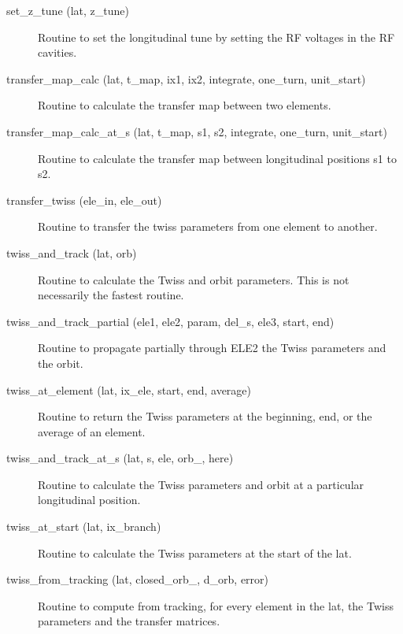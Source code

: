 \begin{description}
\label{r:set.z.tune}
\item[set_z_tune (lat, z_tune)] \Newline
Routine to set the longitudinal tune by setting the RF voltages in the RF cavities. 

\label{r:transfer.map.calc}
\item[transfer_map_calc (lat, t_map, ix1, ix2, integrate, one_turn, unit_start) ] \Newline 
Routine to calculate the transfer map between two elements.

\label{r:transfer.map.calc.at.s}
\item[transfer_map_calc_at_s (lat, t_map, s1, s2, integrate, one_turn, unit_start)] \Newline 
Routine to calculate the transfer map between longitudinal positions
s1 to s2.

\label{r:transfer.twiss}
\item[transfer_twiss (ele_in, ele_out)] \Newline 
Routine to transfer the twiss parameters from one element to another.

\item[twiss_and_track (lat, orb)] \Newline
Routine to calculate the Twiss and orbit parameters. 
This is not necessarily the fastest routine. 

\item[twiss_and_track_partial (ele1, ele2, param, del_s, ele3, start, end)] \Newline
Routine to propagate partially through ELE2 the Twiss parameters and the orbit. 

\label{r:twiss.at.element}
\item[twiss_at_element (lat, ix_ele, start, end, average)] \Newline
Routine to return the Twiss parameters at the beginning, end, or the average of an element. 

\item[twiss_and_track_at_s (lat, s, ele, orb_, here)] \Newline
Routine to calculate the Twiss parameters and orbit at a particular longitudinal position. 

\label{r:twiss.at.start}
\item[twiss_at_start (lat, ix_branch)] \Newline
Routine to calculate the Twiss parameters at the start of the lat. 

\label{r:twiss.from.tracking}
\item[twiss_from_tracking (lat, closed_orb_, d_orb, error)] \Newline
Routine to compute from tracking, for every element in the lat, 
the Twiss parameters and the transfer matrices. 


\end{description}
